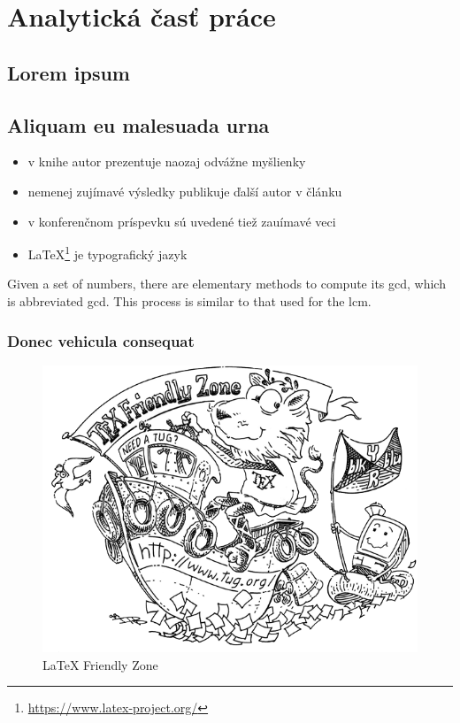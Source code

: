 
\chapter{Analytická časť práce}
\label{analyza}

\section{Lorem ipsum}
\Blindtext
\blinditemize

\section{Aliquam eu malesuada urna}
\blindtext
\begin{itemize}
    \item v knihe \cite{book} autor prezentuje naozaj odvážne myšlienky
    \item nemenej zujímavé výsledky publikuje ďalší autor v článku \cite{article} 
    \item v konferenčnom príspevku \cite{conference} sú uvedené tiež zauímavé veci
    \item \LaTeX{}\footnote{\url{https://www.latex-project.org/}} je typografický jazyk
\end{itemize}

Given a set of numbers, there are elementary methods to compute its \acrlong{gcd}, which is abbreviated \acrshort{gcd}. This process is similar to that used for the \acrfull{lcm}.

\subsection{Donec vehicula consequat}
\blindtext

\begin{figure}[!ht]
    \centering
    \includegraphics[width=.9\textwidth]{figures/tugboat}
    \caption{\LaTeX{} Friendly Zone \label{o:latex_friendly_zone}}
\end{figure}

